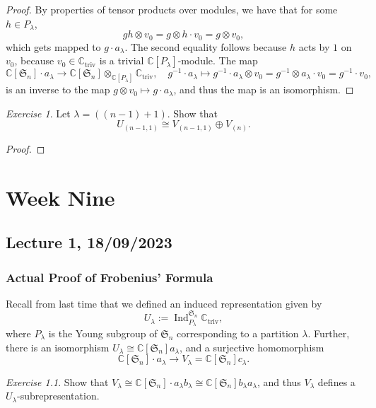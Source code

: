 \documentclass[a4paper]{report}
\theoremstyle{definition}
\theoremstyle{remark}
\theoremstyle{proposition}
\theoremstyle{conjecture}
\theoremstyle{lemma}
\theoremstyle{corollary}
\theoremstyle{exercise}
\newtheorem{exercise}{Exercise}
\theoremstyle{example}
\newcommand{\C}{\mathbb{C}}
\newcommand{\on}{\operatorname}
\begin{document}
\begin{proof}
    By properties of tensor products over modules, we have that for some 
    $h\in P_\lambda$, 
    $$gh \otimes v_0 = g \otimes h\cdot v_0 = g\otimes v_0,$$
    which gets mapped to $g\cdot a_\lambda$. The second equality follows
    because $h$ acts by $1$ on $v_0$, because $v_0 \in \C_{\on{triv}}$ 
    is a trivial $\C[P_\lambda]$-module.
    The map
    $$\C[\mathfrak{S}_n]\cdot a_\lambda \longrightarrow \C[\mathfrak{S}_n]\otimes_{\C[P_\lambda]}\C_{\on{triv}},\quad g^{-1}\cdot a_\lambda \longmapsto g^{-1}\cdot a_\lambda\otimes v_0 = g^{-1}\otimes a_\lambda \cdot v_0 = g^{-1}\cdot v_0,$$
    is an inverse to the map $g\otimes v_0 \mapsto g\cdot a_\lambda$,
    and thus the map is an isomorphism.
\end{proof}

\begin{exercise}
    Let $\lambda = ( (n-1) + 1)$. Show that $$U_{(n-1,1)} \cong V_{(n-1,1)} \oplus V_{(n)}.$$
\end{exercise}

\begin{proof}
    
\end{proof}

\chapter{Week Nine}

\section{Lecture 1, 18/09/2023}

\subsection{Actual Proof of Frobenius' Formula}

Recall from last time that we defined an induced representation given by
$$U_\lambda := \on{Ind}_{P_\lambda}^{\mathfrak{S}_n} \C_{\on{triv}},$$
where $P_\lambda$ is the Young subgroup of $\mathfrak{S}_n$ corresponding
to a partition $\lambda$.
Further, there is an isomorphism 
$U_\lambda \cong \C[\mathfrak{S}_n]a_\lambda$, and a surjective 
homomorphism
$$\C[\mathfrak{S}_n] \cdot a_\lambda \longrightarrow V_\lambda = \C[\mathfrak{S}_n]c_\lambda.$$

\begin{exercise}
    Show that $V_\lambda \cong \C[\mathfrak{S}_n]\cdot a_\lambda b_\lambda \cong \C[\mathfrak{S}_n]b_\lambda a_\lambda$, and thus 
    $V_\lambda$ defines a $U_\lambda$-subrepresentation.
\end{exercise}
\end{document}
